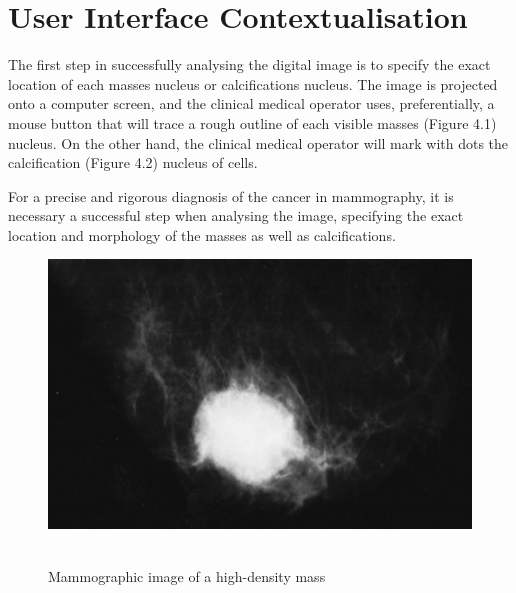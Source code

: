 
\chapter{User Interface Contextualisation}
\label{chapter:user_interface}

The first step in successfully analysing the digital image is to specify the exact location of each masses nucleus or calcifications nucleus. The image is projected onto a computer screen, and the clinical medical operator uses, preferentially, a mouse button that will trace a rough outline of each visible masses (Figure 4.1) nucleus. On the other hand, the clinical medical operator will mark with dots the calcification (Figure 4.2) nucleus of cells.

For a precise and rigorous diagnosis of the cancer in mammography, it is necessary a successful step when analysing the image, specifying the exact location and morphology of the masses as well as calcifications.

\begin{figure}[!hbt]
\centering
\includegraphics[width=15cm]{images/masses}~\\
\caption{\label{fig:frog}Mammographic image of a high-density mass
}
\end{figure}

